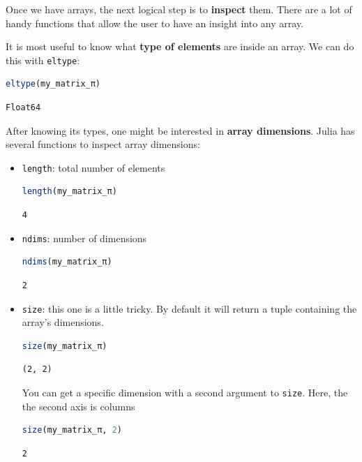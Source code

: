 \documentclass[
  notoc %
]{tufte-book}
\newcommand{\passthrough}[1]{#1}
\begin{document}
Once we have arrays, the next logical step is to \textbf{inspect} them.
There are a lot of handy functions that allow the user to have an
insight into any array.

It is most useful to know what \textbf{type of elements} are inside an
array. We can do this with \passthrough{\lstinline!eltype!}:

\begin{lstlisting}[language=Julia]
eltype(my_matrix_π)
\end{lstlisting}

\begin{lstlisting}[language=Output]
Float64
\end{lstlisting}

After knowing its types, one might be interested in \textbf{array
dimensions}. Julia has several functions to inspect array dimensions:

\begin{itemize}
\item
  \passthrough{\lstinline!length!}: total number of elements

  \begin{lstlisting}[language=Julia]
  length(my_matrix_π)
  \end{lstlisting}

  \begin{lstlisting}[language=Output]
  4
  \end{lstlisting}
\item
  \passthrough{\lstinline!ndims!}: number of dimensions

  \begin{lstlisting}[language=Julia]
  ndims(my_matrix_π)
  \end{lstlisting}

  \begin{lstlisting}[language=Output]
  2
  \end{lstlisting}
\item
  \passthrough{\lstinline!size!}: this one is a little tricky. By
  default it will return a tuple containing the array's dimensions.

  \begin{lstlisting}[language=Julia]
  size(my_matrix_π)
  \end{lstlisting}

  \begin{lstlisting}[language=Output]
  (2, 2)
  \end{lstlisting}

  You can get a specific dimension with a second argument to
  \passthrough{\lstinline!size!}. Here, the the second axis is columns

  \begin{lstlisting}[language=Julia]
  size(my_matrix_π, 2)
  \end{lstlisting}

  \begin{lstlisting}[language=Output]
  2
  \end{lstlisting}
\end{itemize}
\end{document}
